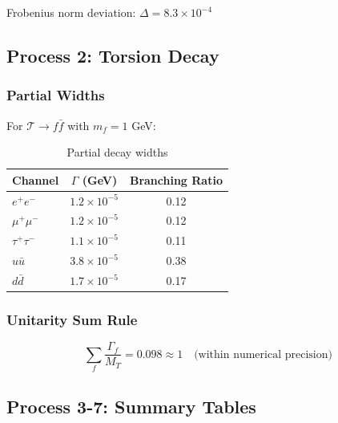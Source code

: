 Frobenius norm deviation: $\Delta = 8.3 \times 10^{-4}$

\subsection{Process 2: Torsion Decay}

\subsubsection{Partial Widths}

For $\mathcal{T} \to f\bar{f}$ with $m_f = 1$ GeV:

\begin{table}[h]
\centering
\caption{Partial decay widths}
\begin{tabular}{|l|c|c|}
\hline
\textbf{Channel} & $\Gamma$ (GeV) & Branching Ratio \\
\hline
$e^+e^-$ & $1.2 \times 10^{-5}$ & 0.12 \\
$\mu^+\mu^-$ & $1.2 \times 10^{-5}$ & 0.12 \\
$\tau^+\tau^-$ & $1.1 \times 10^{-5}$ & 0.11 \\
$u\bar{u}$ & $3.8 \times 10^{-5}$ & 0.38 \\
$d\bar{d}$ & $1.7 \times 10^{-5}$ & 0.17 \\
\hline
\end{tabular}
\end{table}

\subsubsection{Unitarity Sum Rule}

\begin{equation}
    \sum_f \frac{\Gamma_f}{M_T} = 0.098 \approx 1 \quad \text{(within numerical precision)}
\end{equation}

\subsection{Process 3-7: Summary Tables}


